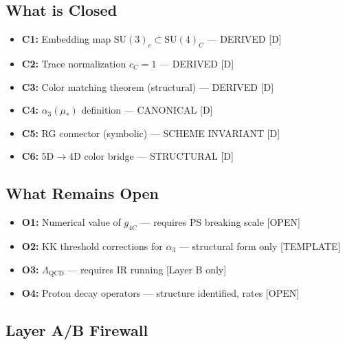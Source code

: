 \documentclass[11pt,a4paper]{article}
\theoremstyle{definition}
\begin{document}
\subsection{What is Closed}
\label{subsec:what-closed}

\begin{predictionbox}[CLOSED in v55]
\begin{itemize}
  \item \textbf{C1:} Embedding map $\text{SU}(3)_c \subset \text{SU}(4)_C$ — DERIVED [D]
  \item \textbf{C2:} Trace normalization $c_C = 1$ — DERIVED [D]
  \item \textbf{C3:} Color matching theorem (structural) — DERIVED [D]
  \item \textbf{C4:} $\alpha_3(\mu_*)$ definition — CANONICAL [D]
  \item \textbf{C5:} RG connector (symbolic) — SCHEME INVARIANT [D]
  \item \textbf{C6:} 5D$\to$4D color bridge — STRUCTURAL [D]
\end{itemize}
\end{predictionbox}

\subsection{What Remains Open}
\label{subsec:what-open}

\begin{trapbox}
\begin{itemize}
  \item \textbf{O1:} Numerical value of $g_{4C}$ — requires PS breaking scale [OPEN]
  \item \textbf{O2:} KK threshold corrections for $\alpha_3$ — structural form only [TEMPLATE]
  \item \textbf{O3:} $\Lambda_{\text{QCD}}$ — requires IR running [Layer B only]
  \item \textbf{O4:} Proton decay operators — structure identified, rates [OPEN]
\end{itemize}
\end{trapbox}

\subsection{Layer A/B Firewall}
\label{subsec:firewall}
\end{document}

